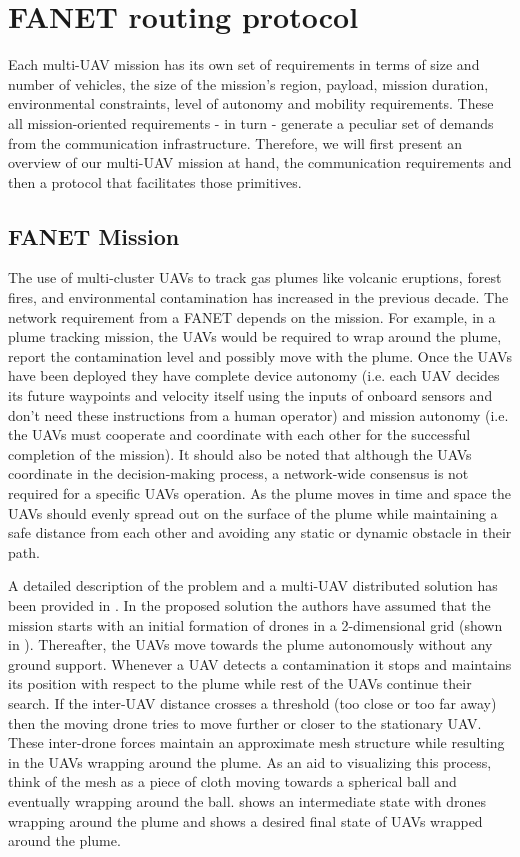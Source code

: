 \chapter{FANET routing protocol}
Each multi-UAV mission has its own set of requirements in terms of size and number of vehicles, the size of the mission's region, payload, mission duration, environmental constraints, level of autonomy and mobility requirements. These all mission-oriented requirements - in turn - generate a peculiar set of demands from the communication infrastructure. Therefore, we will first present an overview of our multi-UAV mission at hand, the communication requirements and then a protocol that facilitates those primitives.

\section{FANET Mission}

The use of multi-cluster UAVs to track gas plumes like volcanic eruptions, forest fires, and environmental contamination has increased in the previous decade. The network requirement from a FANET depends on the mission. For example, in a plume tracking mission, the UAVs would be required to wrap around the plume, report the contamination level and possibly move with the plume. Once the UAVs have been deployed they have complete device autonomy (i.e. each UAV decides its future waypoints and velocity itself using the inputs of onboard sensors and don't need these instructions from a human operator) and mission autonomy (i.e. the UAVs must cooperate and coordinate with each other for the successful completion of the mission). It should also be noted that although the UAVs coordinate in the decision-making process, a network-wide consensus is not required for a specific UAVs operation. As the plume moves in time and space the UAVs should evenly spread out on the surface of the plume while maintaining a safe distance from each other and avoiding any static or dynamic obstacle in their path. 

A detailed description of the problem and a multi-UAV distributed solution has been provided in \cite{8080382}. In the proposed solution the authors have assumed that the mission starts with an initial formation of drones in a 2-dimensional grid (shown in ). Thereafter, the UAVs move towards the plume autonomously without any ground support. Whenever a UAV detects a contamination it stops and maintains its position with respect to the plume while rest of the UAVs continue their search. If the inter-UAV distance crosses a threshold (too close or too far away) then the moving drone tries to move further or closer to the stationary UAV. These inter-drone forces maintain an approximate mesh structure while resulting in the UAVs wrapping around the plume. As an aid to visualizing this process, think of the mesh as a piece of cloth moving towards a spherical ball and eventually wrapping around the ball.  shows an intermediate state with drones wrapping around the plume and  shows a desired final state of UAVs wrapped around the plume.
  

